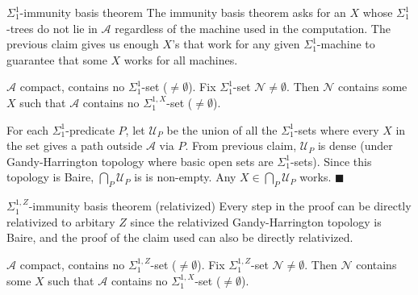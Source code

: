 \begin{frame}{$\Sigma_1^1$-immunity basis theorem}
  The immunity basis theorem asks for an $X$ whose $\Sigma_1^1$-trees do
  not lie in $\mathcal{A}$ regardless of the machine used in the
  computation. The previous claim gives us enough $X$'s that work for any
  given $\Sigma_1^1$-machine to guarantee that some $X$ works for all
  machines.

  \vspace{1em}
  \begin{immunity*}
    $\mathcal{A}$ compact, contains no $\Sigma_1^{1}$-set
    ($\neq\emptyset$). Fix $\Sigma_1^{1}$-set
    $\mathcal{N}\neq\emptyset$. Then $\mathcal{N}$ contains some $X$ such
    that $\mathcal{A}$ contains no $\Sigma_1^{1,X}$-set ($\neq\emptyset$).
  \end{immunity*}

  \vspace{1em}
  For each $\Sigma_1^1$-predicate $P$, let $\mathcal{U}_P$ be the union of
  all the $\Sigma_1^1$-sets where every $X$ in the set gives a path outside
  $\mathcal{A}$ via $P$. From previous claim, $\mathcal{U}_P$ is dense
  (under Gandy-Harrington topology where basic open sets are
  $\Sigma_1^1$-sets). Since this topology is Baire,
  $\bigcap_P\mathcal{U}_P$ is is non-empty. Any
  $X\in\bigcap_P\mathcal{U}_P$ works. $\blacksquare$
\end{frame}

\begin{frame}{$\Sigma_1^{1,Z}$-immunity basis theorem (relativized)}
  Every step in the proof can be directly relativized to arbitary $Z$ since
  the relativized Gandy-Harrington topology is Baire, and the proof of the
  claim used can also be directly relativized.

  \vspace{0.5em}
  \begin{immunity*}[Relativized]
    $\mathcal{A}$ compact, contains no $\Sigma_1^{1,Z}$-set
    ($\neq\emptyset$). Fix $\Sigma_1^{1,Z}$-set
    $\mathcal{N}\neq\emptyset$. Then $\mathcal{N}$ contains some $X$ such
    that $\mathcal{A}$ contains no $\Sigma_1^{1,X}$-set ($\neq\emptyset$).
  \end{immunity*}
\end{frame}

